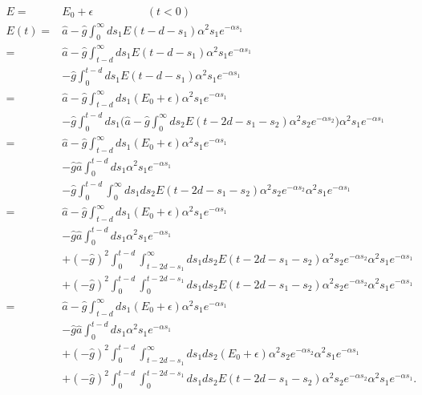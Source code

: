 \begin{align}
	E =& E_0 + \epsilon \hspace{2cm} (t<0) \\
	E(t) =& \hat{a} - \hat{g} \int_{0}^{\infty} ds_1 E(t - d - s_1) \alpha^2 s_1 e^{-\alpha s_1} \\
	=& \hat{a} - \hat{g} \int_{t - d}^{\infty} ds_1 E(t - d - s_1) \alpha^2 s_1 e^{-\alpha s_1} \\
	& - \hat{g} \int_{0}^{t - d} ds_1 E(t - d - s_1) \alpha^2 s_1 e^{-\alpha s_1} \\
	=& \hat{a} - \hat{g} \int_{t - d}^{\infty} ds_1 ( E_0 + \epsilon ) \alpha^2 s_1 e^{-\alpha s_1}\\
	& - \hat{g} \int_{0}^{t - d} ds_1 \big( \hat{a} - \hat{g} \int_{0}^{\infty} ds_2 E(t - 2d - s_1 - s_2) \alpha^2 s_2 e^{-\alpha s_2} \big) \alpha^2 s_1 e^{-\alpha s_1} \\
	=& \hat{a} - \hat{g} \int_{t - d}^{\infty} ds_1 ( E_0 + \epsilon ) \alpha^2 s_1 e^{-\alpha s_1}\\
	& - \hat{g} \hat{a} \int_{0}^{t - d} ds_1 \alpha^2 s_1 e^{-\alpha s_1}\\
	& - \hat{g} \int_{0}^{t - d} \int_{0}^{\infty} ds_1 ds_2 E(t - 2d - s_1 - s_2) \alpha^2 s_2 e^{-\alpha s_2} \alpha^2 s_1 e^{-\alpha s_1} \\
	=& \hat{a} - \hat{g} \int_{t - d}^{\infty} ds_1 ( E_0 + \epsilon ) \alpha^2 s_1 e^{-\alpha s_1}\\
	&- \hat{g} \hat{a} \int_{0}^{t - d} ds_1 \alpha^2 s_1 e^{-\alpha s_1}\\
	&+ (-\hat{g})^2 \int_{0}^{t-d} \int_{t - 2d - s_1}^{\infty} ds_1 ds_2 E(t - 2d - s_1 - s_2) \alpha^2 s_2 e^{-\alpha s_2} \alpha^2 s_1 e^{-\alpha s_1} \\
	&+ (-\hat{g})^2 \int_{0}^{t - d} \int_{0}^{t - 2d - s_1} ds_1 ds_2 E(t - 2d - s_1 - s_2) \alpha^2 s_2 e^{-\alpha s_2} \alpha^2 s_1 e^{-\alpha s_1} \\
	=& \hat{a} - \hat{g} \int_{t - d}^{\infty} ds_1 ( E_0 + \epsilon ) \alpha^2 s_1 e^{-\alpha s_1}\\
	& - \hat{g} \hat{a} \int_{0}^{t - d} ds_1 \alpha^2 s_1 e^{-\alpha s_1}\\
	& +(-\hat{g})^2 \int_{0}^{t-d} \int_{t - 2d - s_1}^{\infty} ds_1 ds_2 (E_0 + \epsilon) \alpha^2 s_2 e^{-\alpha s_2} \alpha^2 s_1 e^{-\alpha s_1} \\
	& +(-\hat{g})^2 \int_{0}^{t - d} \int_{0}^{t - 2d - s_1} ds_1 ds_2 E(t - 2d - s_1 - s_2) \alpha^2 s_2 e^{-\alpha s_2} \alpha^2 s_1 e^{-\alpha s_1} .
\end{align}


